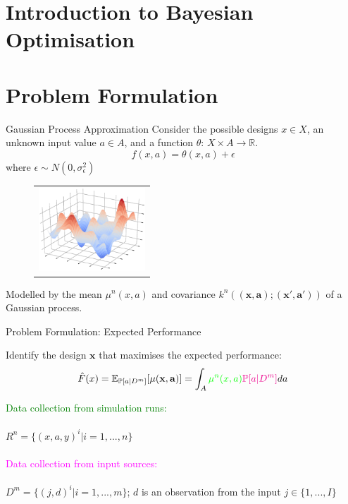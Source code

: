 \documentclass{beamer}
\begin{document}
\section{Introduction to Bayesian Optimisation}


\section{Problem Formulation}
\begin{frame}{Gaussian Process Approximation}
Consider the possible designs $x \in X$, an unknown input value $a \in A$, and a function $\theta$: $X \times A \rightarrow \mathbb{R}$. 
 $$f(x,a) = \theta(x,a) +\epsilon$$
  where $\epsilon \sim N(0,\sigma^{2}_{\epsilon})$
  
  \begin{figure}
  	\centering
  	\begin{tabular}{c}
  		\includegraphics[width=4cm]{Presentation_plot_12.eps}\\
  	\end{tabular}
  \end{figure}
  Modelled by the mean \small{$\mu^{n}(x,a)$} \normalsize{and covariance} \small{$k^n((\mathbf{x},\mathbf{a});(\mathbf{x}',\mathbf{a}'))$} \normalsize{of a Gaussian process}.
  
\end{frame}



\begin{frame}{Problem Formulation: Expected Performance}

Identify the design $\mathbf{x}$ that maximises the expected performance:
$$\hat{F}(x) = \mathbb{E}_{\mathbb{P}[a|D^{m}]}[\mu(\mathbf{x},\mathbf{a})] = \int_{A}\textcolor{green}{\mu^{n}(x,a)}\textcolor{magenta}{\mathbb{P}[a|D^{m}]}da$$

\textcolor{green}{Data collection from simulation runs:}\\~\\
$R^{n} =\{(x, a, y)^{i}	|i = 1, . . . ,n\}$\\~\\

\textcolor{magenta}{Data collection from input sources:} \\~\\
$D^{m} = \{(j	,d)^{i}|i = 1, . . . ,m\}$; $d$ is an observation from the input $j \in \{1, . . . , I \}$


\end{frame}
\end{document}
